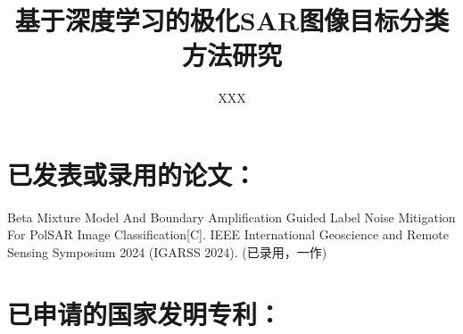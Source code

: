 \documentclass[promaster]{thesis-uestc}
\title{基于深度学习的极化SAR图像目标分类方法研究}{Research on Target Classification Method of Polarimetric SAR Images Based on Deep Learning}
\author{XXX}{XXX}
\begin{document}
\makecover
\originalitydeclaration %





\thesistableofcontents








% 



%
% 
%


%

% 
% 



\begin{thesistheaccomplish}
    \section*{已发表或录用的论文：}
     Beta Mixture Model And Boundary Amplification Guided Label Noise Mitigation For PolSAR Image Classification[C]. IEEE International Geoscience and Remote Sensing Symposium 2024 (IGARSS 2024). (已录用，一作)
    \section*{已申请的国家发明专利：}
\end{thesistheaccomplish}
\end{document}
